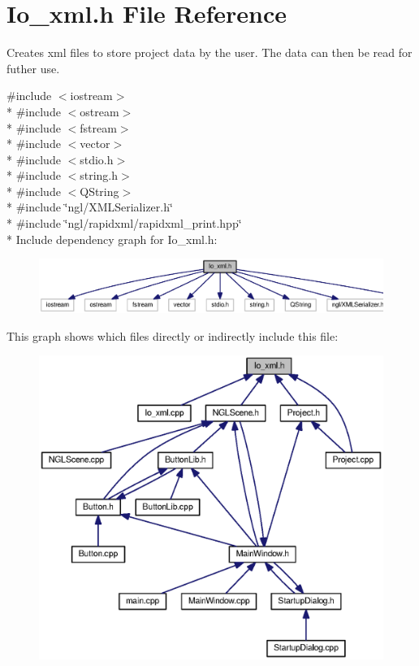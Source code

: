 \section{Io\-\_\-xml.\-h File Reference}
\label{_io__xml_8h}


Creates xml files to store project data by the user. The data can then be read for futher use.  


{\ttfamily \#include $<$iostream$>$}\\*
{\ttfamily \#include $<$ostream$>$}\\*
{\ttfamily \#include $<$fstream$>$}\\*
{\ttfamily \#include $<$vector$>$}\\*
{\ttfamily \#include $<$stdio.\-h$>$}\\*
{\ttfamily \#include $<$string.\-h$>$}\\*
{\ttfamily \#include $<$Q\-String$>$}\\*
{\ttfamily \#include \char`\"{}ngl/\-X\-M\-L\-Serializer.\-h\char`\"{}}\\*
{\ttfamily \#include \char`\"{}ngl/rapidxml/rapidxml\-\_\-print.\-hpp\char`\"{}}\\*
Include dependency graph for Io\-\_\-xml.\-h\-:\nopagebreak
\begin{figure}[H]
\begin{center}
\leavevmode
\includegraphics[width=350pt]{_io__xml_8h__incl}
\end{center}
\end{figure}
This graph shows which files directly or indirectly include this file\-:
\nopagebreak
\begin{figure}[H]
\begin{center}
\leavevmode
\includegraphics[width=350pt]{_io__xml_8h__dep__incl}
\end{center}
\end{figure}
